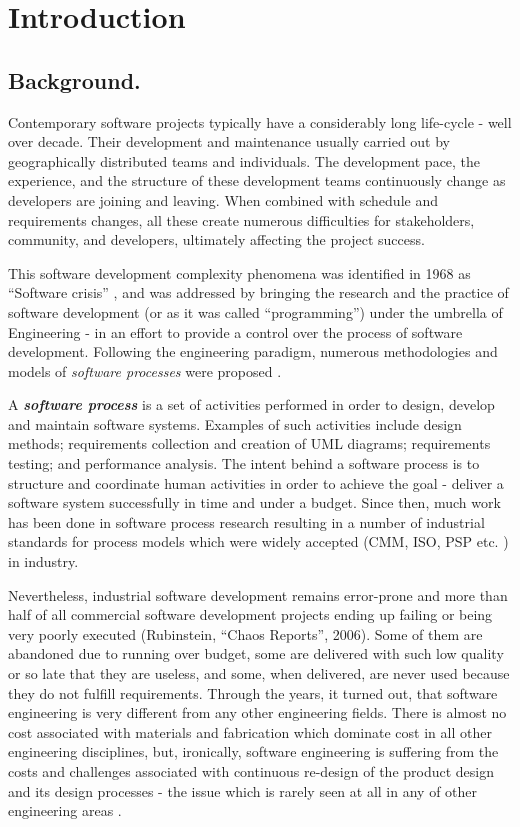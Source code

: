 \chapter{Introduction}

\section{Background.}
Contemporary software projects typically have a considerably long life-cycle - well over decade.
Their development and maintenance usually carried out by geographically distributed teams 
and individuals. The development pace, the experience, and the structure of these development 
teams continuously change as developers are joining and leaving. When combined with
schedule and requirements changes, all these create numerous difficulties 
for stakeholders, community, and developers, ultimately affecting the project success. 

This software development complexity phenomena was identified in 1968 as ``Software crisis'' \cite{crisis}, 
and was addressed by bringing the research and the practice of software development 
(or as it was called ``programming'') under the umbrella of Engineering - in an effort to provide a 
control over the process of software development. 
Following the engineering paradigm, numerous methodologies and models of \textit{software processes}
were proposed \cite{citeulike:10002165}.

A \textbf{\textit{software process}} is a set of activities performed in order to design, develop and maintain 
software systems. Examples of such activities include design methods; requirements collection and creation of
UML diagrams; requirements testing; and performance analysis. 
The intent behind a software process is to structure and coordinate human activities in order to achieve 
the goal - deliver a software system successfully in time and under a budget.
Since then, much work has been done in software process research resulting in a number of industrial standards for 
process models which were widely accepted (CMM, ISO, PSP etc. \cite{citeulike:5043104}) in industry. 

Nevertheless, industrial software development remains error-prone and more than half of all commercial software
development projects ending up failing or being very poorly executed (Rubinstein, ``Chaos Reports'', 2006). 
Some of them are abandoned due to running over budget, some are delivered with such low quality or so late that
they are useless, and some, when delivered, are never used because they do not fulfill requirements. 
Through the years, it turned out, that software engineering is very different from any other engineering fields. 
There is almost no cost associated with materials and fabrication which dominate cost in all other 
engineering disciplines, but, ironically, software engineering is suffering from the costs and challenges
associated with continuous re-design of the product design and its design processes - 
the issue which is rarely seen at all in any of other engineering areas \cite{citeulike:5203446}.

